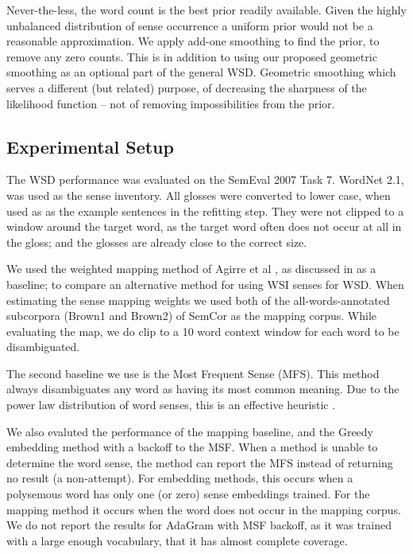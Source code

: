 \documentclass{sig-alternate}
\begin{document}
Never-the-less, the word count is the best prior readily available. Given the highly unbalanced distribution of sense occurrence a uniform prior would not be a reasonable approximation.
We apply add-one smoothing to find the prior, to remove any zero counts.
This is in addition to using our proposed geometric smoothing as an optional part of the general WSD.
Geometric smoothing which serves a different (but related) purpose, of decreasing the sharpness of the likelihood function -- not of removing impossibilities from the prior.

\subsection {Experimental Setup}
The WSD performance was evaluated on the SemEval 2007 Task 7. 
WordNet 2.1, was used as the sense inventory.
All glosses were converted to lower case, when used as as the example sentences in the refitting step. They were not clipped to a window around the target word, as the target word often does not occur at all in the gloss; and the glosses are already close to the correct size.

We used the weighted mapping method of Agirre et al \parencite{agirre2006}, as discussed in  as a baseline; to compare an alternative method for using WSI senses for WSD.
When estimating the sense mapping weights we used both of the all-words-annotated subcorpora (Brown1 and Brown2) of SemCor as the mapping corpus.
While evaluating the map, we do clip to a 10 word context window for each word to be disambiguated.

The second baseline we use is the Most Frequent Sense (MFS). This method always disambiguates any word as having its  most common meaning. Due to the power law distribution of word senses, this is an effective heuristic \parencite{Kilgarriff2004}.

We also evaluted the performance of the mapping baseline, and the Greedy embedding method with a backoff to the MSF. When a method is unable to determine the word sense, the method can report the MFS instead of returning no result (a non-attempt). For embedding methods, this occurs when a polysemous word has only one (or zero) sense embeddings trained. For the mapping method it occurs when the word does not occur in the mapping corpus. We do not report the results for AdaGram with MSF backoff, as it was trained with a large enough vocabulary, that it has almost complete coverage.
\end{document}
